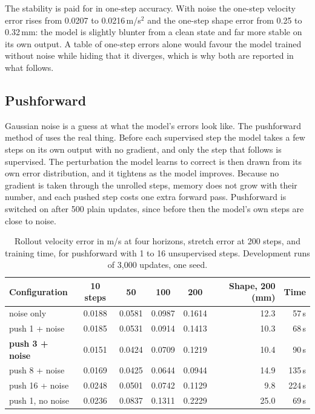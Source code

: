 The stability is paid for in one-step accuracy. With noise the one-step velocity error rises from 0.0207 to 0.0216\,m/s$^2$ and the one-step shape error from 0.25 to 0.32\,mm: the model is slightly blunter from a clean state and far more stable on its own output. A table of one-step errors alone would favour the model trained without noise while hiding that it diverges, which is why both are reported in what follows.

\subsection{Pushforward}

Gaussian noise is a guess at what the model's errors look like. The pushforward method of \cite{brandstetter2022mppde} uses the real thing. Before each supervised step the model takes a few steps on its own output with no gradient, and only the step that follows is supervised. The perturbation the model learns to correct is then drawn from its own error distribution, and it tightens as the model improves. Because no gradient is taken through the unrolled steps, memory does not grow with their number, and each pushed step costs one extra forward pass. Pushforward is switched on after 500 plain updates, since before then the model's own steps are close to noise.

\begin{table}[htbp]
    \centering
    \begin{tabular}{lccccrr}
        \toprule
        Configuration & 10 steps & 50 & 100 & 200 & Shape, 200 (mm) & Time \\
        \midrule
        noise only          & 0.0188 & 0.0581 & 0.0987 & 0.1614 & 12.3 & 57\,s \\
        push 1 + noise      & 0.0185 & 0.0531 & 0.0914 & 0.1413 & 10.3 & 68\,s \\
        \textbf{push 3 + noise} & 0.0151 & 0.0424 & 0.0709 & 0.1219 & 10.4 & 90\,s \\
        push 8 + noise      & 0.0169 & 0.0425 & 0.0644 & 0.0944 & 14.9 & 135\,s \\
        push 16 + noise     & 0.0248 & 0.0501 & 0.0742 & 0.1129 & 9.8  & 224\,s \\
        push 1, no noise    & 0.0236 & 0.0837 & 0.1311 & 0.2229 & 25.0 & 69\,s \\
        \bottomrule
    \end{tabular}
    \caption{Rollout velocity error in m/s at four horizons, stretch error at 200 steps, and training time, for pushforward with 1 to 16 unsupervised steps. Development runs of 3,000 updates, one seed.}
    \label{tab:train_push_sweep}
\end{table}

